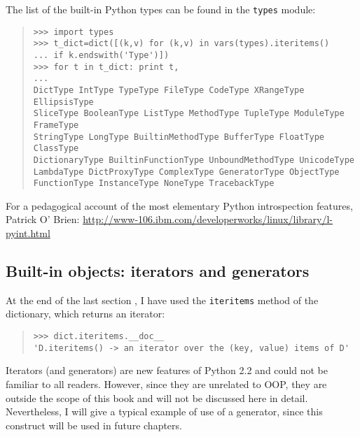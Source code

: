 \documentclass[10pt,english]{article}
\begin{document}
The list of the built-in Python types can be found in the \texttt{types} module:
\begin{quote}
\begin{verbatim}>>> import types
>>> t_dict=dict([(k,v) for (k,v) in vars(types).iteritems() 
... if k.endswith('Type')])
>>> for t in t_dict: print t,
...
DictType IntType TypeType FileType CodeType XRangeType EllipsisType 
SliceType BooleanType ListType MethodType TupleType ModuleType FrameType 
StringType LongType BuiltinMethodType BufferType FloatType ClassType 
DictionaryType BuiltinFunctionType UnboundMethodType UnicodeType 
LambdaType DictProxyType ComplexType GeneratorType ObjectType 
FunctionType InstanceType NoneType TracebackType\end{verbatim}
\end{quote}

For a pedagogical account of the most elementary 
Python introspection features,
Patrick O' Brien:
\href{http://www-106.ibm.com/developerworks/linux/library/l-pyint.html}{http://www-106.ibm.com/developerworks/linux/library/l-pyint.html}



\hypertarget{built-in-objects-iterators-and-generators}{}
\subsection*{Built-in objects: iterators and generators}

At the end of the last section , I have used the \texttt{iteritems} method 
of the dictionary, which returns an iterator:
\begin{quote}
\begin{verbatim}>>> dict.iteritems.__doc__
'D.iteritems() -> an iterator over the (key, value) items of D'\end{verbatim}
\end{quote}

Iterators (and generators) are new features of Python 2.2 and could not be
familiar to all readers. However, since they are unrelated to OOP, they 
are outside the scope of this book and will not be discussed here in detail. 
Nevertheless, I will give a typical example of use of a generator, since
this construct will be used in future chapters.
\end{document}
